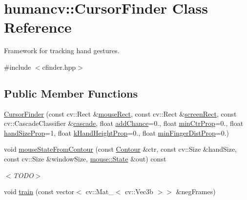 \hypertarget{classhumancv_1_1_cursor_finder}{\section{humancv\-:\-:Cursor\-Finder Class Reference}
\label{classhumancv_1_1_cursor_finder}
}


Framework for tracking hand gestures.  




{\ttfamily \#include $<$cfinder.\-hpp$>$}

\subsection*{Public Member Functions}
\begin{DoxyCompactItemize}
\item 
\hyperlink{classhumancv_1_1_cursor_finder_a3ff8b8961e65f437484cc61bfb28dee1}{Cursor\-Finder} (const cv\-::\-Rect \&\hyperlink{classhumancv_1_1_cursor_finder_ac24299e06cd5d271dac727a80bebc5c3}{mouse\-Rect}, const cv\-::\-Rect \&\hyperlink{classhumancv_1_1_cursor_finder_a8a6474e4cf616789f7b14085e83261c8}{screen\-Rect}, const cv\-::\-Cascade\-Classifier \&\hyperlink{classhumancv_1_1_cursor_finder_a5dd2e09ff9ca7e0667d0267d571a31ff}{cascade}, float \hyperlink{classhumancv_1_1_cursor_finder_ad7607c9dd807d16db9cda9cea42e8dcb}{add\-Chance}=0., float \hyperlink{classhumancv_1_1_cursor_finder_aefec5ff071032bfce5d46c4cdedf3f10}{min\-Ctr\-Prop}=0., float \hyperlink{classhumancv_1_1_cursor_finder_a647e0325a998393648793c069524454d}{hand\-Size\-Prop}=1, float \hyperlink{classhumancv_1_1_cursor_finder_a816167296fd52528605710cccd3336b8}{k\-Hand\-Height\-Prop}=0., float \hyperlink{classhumancv_1_1_cursor_finder_a8703da65435e5707559fe59180634b40}{min\-Finger\-Dist\-Prop}=0.)
\item 
void \hyperlink{classhumancv_1_1_cursor_finder_af2069456a8a2ec608e5d5cdd109d5396}{mouse\-State\-From\-Contour} (const \hyperlink{namespacehumancv_ac3621cda88df26d2718f6bd5ec4de1dd}{Contour} \&ctr, const cv\-::\-Size \&hand\-Size, const cv\-::\-Size \&window\-Size, \hyperlink{structmouse_1_1_state}{mouse\-::\-State} \&out) const 
\begin{DoxyCompactList}\small\item\em $<$\-T\-O\-D\-O$>$ \end{DoxyCompactList}\item 
void \hyperlink{classhumancv_1_1_cursor_finder_a2767654c55943ef9d7e516a9f08dcb8a}{train} (const vector$<$ cv\-::\-Mat\-\_\-$<$ cv\-::\-Vec3b $>$$>$ \&neg\-Frames)
$$
\end{DoxyCompactItemize}
